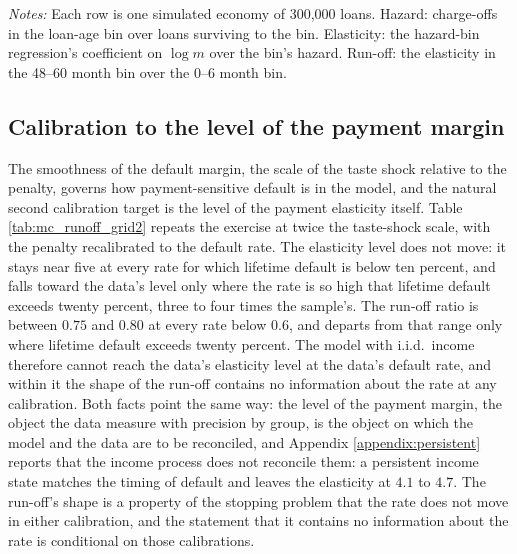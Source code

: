 \documentclass[12pt,english]{article}
\begin{document}
\begin{table}[H]
\centering
\caption{The structural model's hazard and payment elasticity by loan age, on a grid of the true discount rate (penalty scale calibrated to a five percent lifetime default rate; anticipated exits at $0.22$ per year)}
\label{tab:mc_runoff_grid}
\small
\resizebox{\textwidth}{!}{}
\vspace{0.5em}
\noindent \small \textit{Notes:} Each row is one simulated economy of 300,000 loans. Hazard: charge-offs in the loan-age bin over loans surviving to the bin. Elasticity: the hazard-bin regression's coefficient on $\log m$ over the bin's hazard. Run-off: the elasticity in the 48--60 month bin over the 0--6 month bin.
\end{table}

\subsection{Calibration to the level of the payment margin}
The smoothness of the default margin, the scale of the taste shock relative to the penalty, governs how payment-sensitive default is in the model, and the natural second calibration target is the level of the payment elasticity itself. Table \ref{tab:mc_runoff_grid2} repeats the exercise at twice the taste-shock scale, with the penalty recalibrated to the default rate. The elasticity level does not move: it stays near five at every rate for which lifetime default is below ten percent, and falls toward the data's level only where the rate is so high that lifetime default exceeds twenty percent, three to four times the sample's. The run-off ratio is between $0.75$ and $0.80$ at every rate below $0.6$, and departs from that range only where lifetime default exceeds twenty percent. The model with i.i.d.\ income therefore cannot reach the data's elasticity level at the data's default rate, and within it the shape of the run-off contains no information about the rate at any calibration. Both facts point the same way: the level of the payment margin, the object the data measure with precision by group, is the object on which the model and the data are to be reconciled, and Appendix \ref{appendix:persistent} reports that the income process does not reconcile them: a persistent income state matches the timing of default and leaves the elasticity at $4.1$ to $4.7$. The run-off's shape is a property of the stopping problem that the rate does not move in either calibration, and the statement that it contains no information about the rate is conditional on those calibrations.
\end{document}
